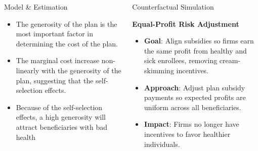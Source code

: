 \documentclass{beamer}
\begin{document}
\begin{frame}[t]
\begin{columns}[t]
\begin{column}{.3\textwidth}
\begin{block}{Model \& Estimation}
      
      \begin{itemize}
        \item The generosity of the plan is the most important factor in determining the cost of the plan.
        \item The marginal cost increase non-linearly with the generosity of the plan, suggesting that the self-selection effects.
        \item Because of the self-selection effects, a high generosity will attract beneficiaries with bad health 
      \end{itemize}
      \end{block}

    \end{column}
    \begin{column}{.25 \textwidth}
      \begin{block}{Counterfactual Simulation}
        \begin{center}
          \textbf{Equal-Profit Risk Adjustment}
        \end{center}

        \begin{itemize}
          \item \textbf{Goal}: Align subsidies so firms earn the same profit from healthy and sick enrollees, removing cream-skimming incentives.
          \item \textbf{Approach}: Adjust plan subsidy payments so expected profits are uniform across all beneficiaries.
          \item \textbf{Impact}: Firms no longer have incentives to favor healthier individuals. 
        \end{itemize}
        

\end{block}
\end{column}
\end{columns}
\end{frame}
\end{document}

